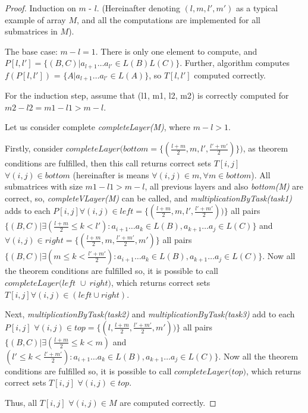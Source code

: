 \begin{proof}
Induction on $\textit{m - l}$. (Hereinafter denoting $(l, m, l', m')$ as a typical example of array $M$, and all the computations are implemented for all submatrices in $M$).

The base case: $m - l = 1$. There is only one element to compute, and $P[l, l'] =  \{ (B, C) |  a_{l + 1} \dots a_{l'} \in L(B)L(C)\}$. Further, algorithm computes $f(P[l, l'])$ = \linebreak $\{ A |  a_{l + 1} \dots a_{l'} \in L(A)\}$, so $T[l, l']$ computed correctly.

For the induction step, assume that (l1, m1, l2, m2) is correctly computed for $m2 - l2 = m1 - l1 > m - l$.

Let us consider complete \textit{completeLayer(M)}, where $m - l > 1$.

Firstly, consider $\textit{completeLayer(bottom} = \{(\frac{l+m}{2}, m, l', \frac{l'+m'}{2})\})$, as theorem conditions are fulfilled, then this call returns correct sets $T[i, j]$ $\forall (i, j) \in bottom$ (hereinafter is means $\forall (i, j) \in m, \forall m \in \textit{bottom} $). All submatrices with size $ m1 - l1 > m - l $, all previous layers and also \textit{bottom(M)} are correct, so,  \textit{completeVLayer(M)} can be called, and \textit{multiplicationByTask(task1)} adds to each
$ P[i, j] \forall (i, j) \in left = \{(\frac{l+m}{2}, m, l', \frac{l'+m'}{2}))\} $
all pairs
$ \{(B, C) |\exists (\frac{l+m}{2} \le k < l'): a_{i + 1} \dots a_{k} \in L(B), a_{k + 1} \dots a_{j} \in L(C)\} $
 and
$ \forall (i, j) \in right = \{(\frac{l+m}{2}, m, \frac{l'+m'}{2}, m')\} $
 all pairs
$ \{ (B, C) |\exists (m \le k < \frac{l'+m'}{2}): a_{i + 1} \dots a_{k} \in L(B), a_{k + 1} \dots a_{j} \in L(C)\}$.
Now all the theorem conditions are fulfilled so, it is possible to call $\textit{completeLayer(left } \cup  \ right)$, which returns correct sets $T[i, j] \forall (i, j) \in (left \cup right)$.

Next, \textit{multiplicationByTask(task2)} and \textit{multiplicationByTask(task3)} add to each $P[i, j]$ $\forall (i, j) \in top = \{(l, \frac{l+m}{2}, \frac{l'+m'}{2}, m'))\}$ all pairs $\{(B, C) |\exists (\frac{l+m}{2} \le k < m)$ and $(l' \le k < \frac{l'+m'}{2}) : a_{i + 1} \dots a_{k} \in L(B), a_{k + 1} \dots a_{j} \in L(C)\}$. Now all the theorem conditions are fulfilled so, it is possible to call $\textit{completeLayer(top)}$, which returns correct sets $T[i, j]$ $\forall (i, j) \in top$.

Thus, all $T[i, j]$ $\forall (i, j) \in M$ are computed correctly.
\end{proof}

